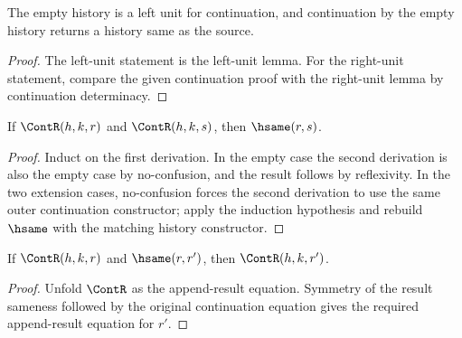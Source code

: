 \begin{theorem}
\label{thm:continuation-unit-laws}
The empty history is a left unit for continuation, and continuation by the empty history returns a history same as the source.
\end{theorem}
\begin{proof}
The left-unit statement is the left-unit lemma. For the right-unit statement, compare the given continuation proof with the right-unit lemma by continuation determinacy.
\end{proof}

\begin{theorem}
If \(\ContR(h,k,r)\) and \(\ContR(h,k,s)\), then \(\hsame(r,s)\).
\end{theorem}
\begin{proof}
Induct on the first derivation. In the empty case the second derivation is also the empty case by no-confusion, and the result follows by reflexivity. In the two extension cases, no-confusion forces the second derivation to use the same outer continuation constructor; apply the induction hypothesis and rebuild \(\hsame\) with the matching history constructor.
\end{proof}

\begin{theorem}
\label{thm:cont-result-hsame-transport}
If \(\ContR(h,k,r)\) and \(\hsame(r,r')\), then \(\ContR(h,k,r')\).
\end{theorem}
\begin{proof}
Unfold \(\ContR\) as the append-result equation. Symmetry of the result sameness followed by the original continuation equation gives the required append-result equation for \(r'\).
\end{proof}

